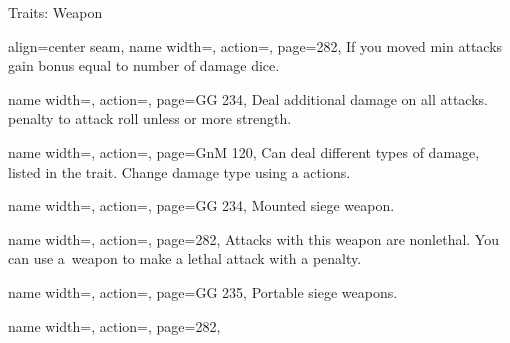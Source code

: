 \begin{PageBackLandscape}
\begin{TablesHalf}{\backTableHeight}
\begin{Table}{Traits: Weapon}
\begin{entry}{}{%
                align=center seam,
                name width=\conditionLength,%
                action=\Jousting,
                page=282,
            }
                If you moved min  \Feet attacks gain \Cirm bonus equal to number of damage dice.
            \end{entry}
            \breakLine
            \begin{entry}{}{%
                name width=\conditionLength,%
                action=\Kickback,
                page=GG 234,
            }
                Deal  additional damage on all attacks.
                 \Cirm penalty to attack roll unless  or more strength. \hfill
            \end{entry}
            \begin{entry}{}{%
                name width=\conditionLength,%
                action=\Modular,
                page=GnM 120,
            }
                Can deal different types of damage, listed in the trait.
                Change damage type using a  actions.
            \end{entry}
            \begin{entry}{}{%
                name width=\conditionLength,%
                action=\Mounted,
                page=GG 234,
            }
                Mounted siege weapon.
            \end{entry}
            \breakLine
            \begin{entry}{}{%
                name width=\conditionLength,%
                action=\Nonlethal,
                page=282,
            }
                Attacks with this weapon are nonlethal.
                You can use a \Nonlethal\,weapon to make a lethal attack with a  \Cirm penalty.
            \end{entry}
            \breakLine
            \begin{entry}{}{%
                name width=\conditionLength,%
                action=\Portable,
                page=GG 235,
            }
                Portable siege weapons.
            \end{entry}
            \begin{entry}{}{%
                name width=\conditionLength,%
                action=\Propulsive,
                page=282,
            }

\end{entry}
\end{Table}
\end{TablesHalf}
\end{PageBackLandscape}
